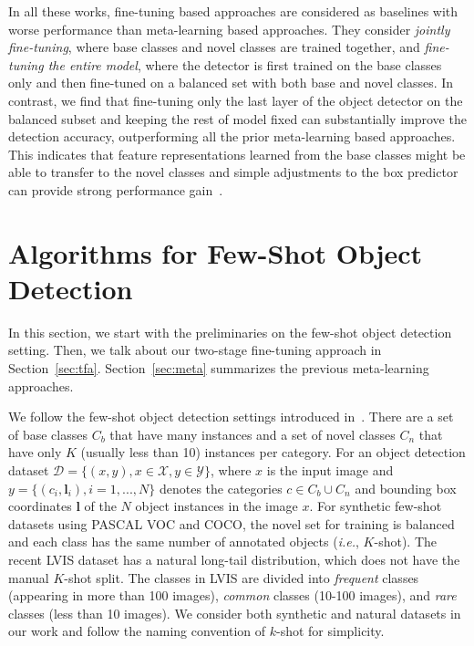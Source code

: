 \documentclass{article}
\renewcommand{\vec}[1]{\mathbf{#1}}
\begin{document}
In all these works, fine-tuning based approaches are considered as baselines
with worse performance than meta-learning based approaches. They consider
\emph{jointly fine-tuning}, where base classes and novel classes are trained together, and \emph{fine-tuning the entire model}, where the detector is first trained on the base classes only and then fine-tuned on a balanced set with both base and novel classes. In contrast, we find that fine-tuning only the last layer of the object detector on the balanced subset and keeping the rest of model fixed can substantially improve the
detection accuracy, outperforming all the prior meta-learning based
approaches. This indicates that feature representations
learned from the base classes might be able to transfer to the novel classes
and simple adjustments to the box predictor can provide 
strong performance gain~\cite{dhillon2019baseline}. 


 \vspace{-0.3cm}
\section{Algorithms for Few-Shot Object Detection}

In this section, we start with the preliminaries on the few-shot object detection setting. Then, we talk about our two-stage fine-tuning approach in
Section~\ref{sec:tfa}. Section~\ref{sec:meta} summarizes the previous meta-learning approaches.

We follow the few-shot object detection settings introduced in~\citet{kang2019few}. There are a set of base
classes $C_b$ that have many instances and a set of novel classes $C_n$ that
have only $K$ (usually less than 10) instances per category.
For an object detection dataset $\mathcal{D}=\{(x, y), x\in\mathcal{X}, y\in\mathcal{Y}\}$, where $x$
is the input image and $y=\{(c_i, \vec{l}_i), i=1, ...,N\}$ denotes the categories $c \in C_b \cup C_n$
and bounding box coordinates $\vec{l}$ of the $N$ object instances in the image $x$.
For synthetic few-shot datasets using
PASCAL VOC and COCO, the novel set for training is balanced and each class has the same number of 
annotated objects (\textit{i.e.}, $K$-shot). The recent LVIS dataset has a natural long-tail distribution, which does
not have the manual $K$-shot split. The classes in LVIS are divided into \emph{frequent} classes
(appearing in more than 100 images), \emph{common} classes (10-100 images), and \emph{rare}
classes (less than 10 images). We consider both synthetic and natural datasets in our work and
follow the naming convention of $k$-shot for simplicity. 
\end{document}
